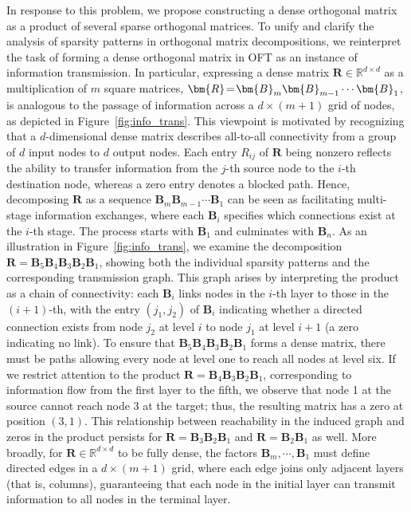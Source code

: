 In response to this problem, we propose constructing a dense orthogonal matrix as a product of several sparse orthogonal matrices. To unify and clarify the analysis of sparsity patterns in orthogonal matrix decompositions, we reinterpret the task of forming a dense orthogonal matrix in OFT as an instance of information transmission. In particular, expressing a dense matrix $\bm{R}\in\mathbb{R}^{d\times d}$ as a multiplication of $m$ square matrices, $\thickmuskip=2mu \medmuskip=2mu \bm{R}=\bm{B}_m\bm{B}_{m-1}\cdots\bm{B}_1$, is analogous to the passage of information across a $d\times (m+1)$ grid of nodes, as depicted in Figure~\ref{fig:info_trans}. This viewpoint is motivated by recognizing that a $d$-dimensional dense matrix describes all-to-all connectivity from a group of $d$ input nodes to $d$ output nodes. Each entry $R_{ij}$ of $\bm{R}$ being nonzero reflects the ability to transfer information from the $j$-th source node to the $i$-th destination node, whereas a zero entry denotes a blocked path. Hence, decomposing $\bm{R}$ as a sequence $\bm{B}_m\bm{B}_{m-1}\cdots\bm{B}_1$ can be seen as facilitating multi-stage information exchanges, where each $\bm{B}_i$ specifies which connections exist at the $i$-th stage. The process starts with $\bm{B}_1$ and culminates with $\bm{B}_n$. As an illustration in Figure~\ref{fig:info_trans}, we examine the decomposition $\bm{R}=\bm{B}_5\bm{B}_4\bm{B}_3\bm{B}_2\bm{B}_1$, showing both the individual sparsity patterns and the corresponding transmission graph. This graph arises by interpreting the product as a chain of connectivity: each $\bm{B}_i$ links nodes in the $i$-th layer to those in the $(i+1)$-th, with the entry $(j_1, j_2)$ of $\bm{B}_i$ indicating whether a directed connection exists from node $j_2$ at level $i$ to node $j_1$ at level $i+1$ (a zero indicating no link). To ensure that $\bm{B}_5\bm{B}_4\bm{B}_3\bm{B}_2\bm{B}_1$ forms a dense matrix, there must be paths allowing every node at level one to reach all nodes at level six. If we restrict attention to the product $\bm{R}=\bm{B}_4\bm{B}_3\bm{B}_2\bm{B}_1$, corresponding to information flow from the first layer to the fifth, we observe that node 1 at the source cannot reach node 3 at the target; thus, the resulting matrix has a zero at position $(3,1)$. This relationship between reachability in the induced graph and zeros in the product persists for $\bm{R}=\bm{B}_3\bm{B}_2\bm{B}_1$ and $\bm{R}=\bm{B}_2\bm{B}_1$ as well. More broadly, for $\bm{R}\in\mathbb{R}^{d\times d}$ to be fully dense, the factors $\bm{B}_m,\cdots,\bm{B}_1$ must define directed edges in a $d\times (m+1)$ grid, where each edge joins only adjacent layers (that is, columns), guaranteeing that each node in the initial layer can transmit information to all nodes in the terminal layer.

